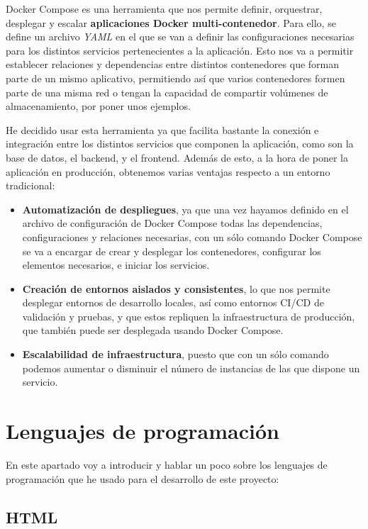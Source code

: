 Docker Compose es una herramienta que nos permite definir, orquestrar, desplegar y escalar \textbf{aplicaciones Docker multi-contenedor}. \cite{docker-compose:overview} Para ello, se define un archivo \textit{YAML} en el que se van a definir las  configuraciones necesarias para los distintos servicios pertenecientes a la aplicación. Esto nos va a permitir establecer relaciones y dependencias entre distintos contenedores que forman parte de un mismo aplicativo, permitiendo así que varios contenedores formen parte de una misma red o tengan la capacidad de compartir volúmenes de almacenamiento, por poner unos ejemplos.

He decidido usar esta herramienta ya que facilita bastante la conexión e integración entre los distintos servicios que componen la aplicación, como son la base de datos, el backend, y el frontend. Además de esto, a la hora de poner la aplicación en producción, obtenemos varias ventajas respecto a un entorno tradicional:

\begin{itemize}

\item \textbf{Automatización de despliegues}, ya que una vez hayamos definido en el archivo de configuración de Docker Compose todas las dependencias, configuraciones y relaciones necesarias, con un sólo comando Docker Compose se va a encargar de crear y desplegar los contenedores, configurar los elementos necesarios, e iniciar los servicios.
\item \textbf{Creación de entornos aislados y consistentes}, lo que nos permite desplegar entornos de desarrollo locales, así como entornos CI/CD de validación y pruebas, y que estos repliquen la infraestructura de producción, que también puede ser desplegada usando Docker Compose.
\item \textbf{Escalabilidad de infraestructura}, puesto que con un sólo comando podemos aumentar o disminuir el número de instancias de las que dispone un servicio.	
\end{itemize}


\section{Lenguajes de programación}

En este apartado voy a introducir y hablar un poco sobre los lenguajes de programación que he usado para el desarrollo de este proyecto:

\subsection{HTML}

